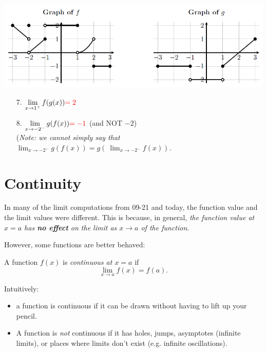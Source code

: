 \documentclass[11pt,reqno,final]{amsart}
\numberwithin{equation}{section}
\numberwithin{figure}{section}
\theoremstyle{definition} %
\newcommand{\dlim}{\displaystyle\lim}
\begin{document}
\newpage
\begin{center}
        \includegraphics[width=.9\textwidth]{09-23P_graphs2.png}
\end{center}

\begin{enumerate}
\item[7.] $\dlim_{x \to 1^+} f(g(x)) {\color{red} = 2}$
        \vfill
\item[8.] $\dlim_{x \to -2^-} g(f(x)) {\color{red} = -1}$ {\color{red}(and NOT $-2$)}\\
          (\textit{Note: we cannot simply say that%
            $\dlim_{x \to -2^-} g(f(x)) = g(\ \dlim_{x \to -2^-} f(x) )$.}
          \vfill
\end{enumerate}

\section{Continuity}

In many of the limit computations from 09-21 and today, the function value and the limit values were different.
This is because, in general, \textit{the function value at $x=a$ has \textbf{no effect} on the limit as $x \to a$ of the function}.

However, some functions are better behaved:
\begin{framed}
        A function $f(x)$ is \textit{continuous at $x=a$} if
        \[
                \dlim_{x \to a} f(x) = f(a).
        \]
\end{framed}

Intuitively:
\begin{itemize}
\item a function is continuous if it can be drawn without having to lift up your pencil.
\item A function is \textit{not} continuous if it has holes, jumps, asymptotes (infinite limits), or places where limits don't exist (e.g. infinite oscillations).
\end{itemize}
\end{document}
